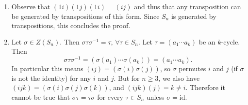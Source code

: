 \documentclass{article}
\begin{document}
\begin{Answer}
\begin{enumerate}
  \item{
    Observe that $(1i)(1j)(1i) = (ij)$ and thus that any transposition
    can be generated by transpositions of this form. Since $S_n$ is
    generated by transpositions, this concludes the proof.
  }
  \item{
    Let $\sigma \in Z(S_n)$. Then $\sigma \tau \sigma^{-1} = \tau$,
    $\forall \tau \in S_n$. Let
    $\tau = (a_1 \cdots a_k)$ be an $k$-cycle. Then
    $$
      \sigma \tau \sigma^{-1}
    = (\sigma(a_1) \cdots \sigma(a_k))
    = (a_1 \cdots a_k).
    $$
    In particular this means
    $(ij) = (\sigma(i) \sigma(j))$, so $\sigma$ permutes $i$ and $j$
    (if $\sigma$ is not the identity)
    for any $i$ and $j$. But for $n \geq 3$, we also have
    $(ijk) = (\sigma(i) \sigma(j) \sigma(k))$, and $(ijk)(j) = k \neq
    i$. Therefore it cannot be true that $\sigma \tau = \tau \sigma$
    for every $\tau \in S_n$ unless $\sigma = \mathrm{id}$.
  }
\end{enumerate}
\end{Answer}
\end{document}
